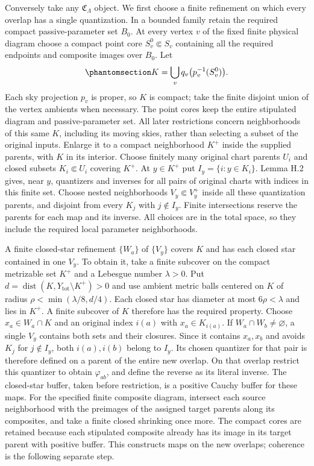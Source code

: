 \documentclass[
  english,
  11pt,
  reqno]{amsart}
\begin{document}
Conversely take any \(\mathfrak C_\Lambda\) object. We first choose a
finite refinement on which every overlap has a single quantization. In a
bounded family retain the required compact passive-parameter set
\(B_0\). At every vertex \(v\) of the fixed finite physical diagram
choose a compact point core \(S_v^0\Subset S_v\) containing all the
required endpoints and composite images over \(B_0\). Let
\begin{equation}\protect\phantomsection\label{eq:gg-quantization-whole-diagram-core}{
 K=\bigcup_v q_v\bigl(p_v^{-1}(S_v^0)\bigr).
}\end{equation} Each sky projection \(p_v\) is proper, so \(K\) is
compact; take the finite disjoint union of the vertex ambients when
necessary. The point cores keep the entire stipulated diagram and
passive-parameter set. All later restrictions concern neighborhoods of
this same \(K\), including its moving skies, rather than selecting a
subset of the original inputs. Enlarge it to a compact neighborhood
\(K^+\) inside the supplied parents, with \(K\) in its interior. Choose
finitely many original chart parents \(U_i\) and closed subsets
\(K_i\Subset U_i\) covering \(K^+\). At \(y\in K^+\) put
\(I_y=\{i:y\in K_i\}\). Lemma H.2 gives, near \(y\), quantizers and
inverses for all pairs of original charts with indices in this finite
set. Choose nested neighborhoods \(V_y\Subset V_y^+\) inside all these
quantization parents, and disjoint from every \(K_j\) with
\(j\notin I_y\). Finite intersections reserve the parents for each map
and its inverse. All choices are in the total space, so they include the
required local parameter neighborhoods.

A finite closed-star refinement \(\{W_a\}\) of \(\{V_y\}\) covers \(K\)
and has each closed star contained in one \(V_y\). To obtain it, take a
finite subcover on the compact metrizable set \(K^+\) and a Lebesgue
number \(\lambda>0\). Put
\(d=\operatorname{dist}(K,Y_{\mathrm{tot}}\setminus K^+)>0\) and use
ambient metric balls centered on \(K\) of radius
\(\rho<\min(\lambda/8,d/4)\). Each closed star has diameter at most
\(6\rho<\lambda\) and lies in \(K^+\). A finite subcover of \(K\)
therefore has the required property. Choose \(x_a\in W_a\cap K\) and an
original index \(i(a)\) with \(x_a\in K_{i(a)}\). If
\(W_a\cap W_b\ne\varnothing\), a single \(V_y\) contains both sets and
their closures. Since it contains \(x_a,x_b\) and avoids \(K_j\) for
\(j\notin I_y\), both \(i(a),i(b)\) belong to \(I_y\). Its chosen
quantizer for that pair is therefore defined on a parent of the entire
new overlap. On that overlap restrict this quantizer to obtain
\(\varphi_{ab}\), and define the reverse as its literal inverse. The
closed-star buffer, taken before restriction, is a positive Cauchy
buffer for these maps. For the specified finite composite diagram,
intersect each source neighborhood with the preimages of the assigned
target parents along its composites, and take a finite closed shrinking
once more. The compact cores are retained because each stipulated
composite already has its image in its target parent with positive
buffer. This constructs maps on the new overlaps; coherence is the
following separate step.
\end{document}
